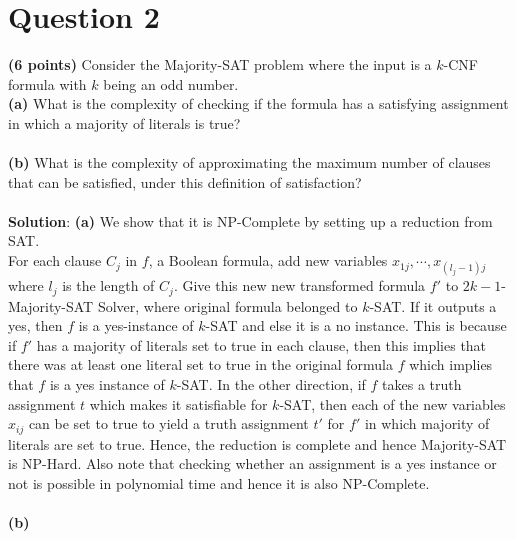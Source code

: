 \documentclass{article}
\begin{document}
\section{Question 2}
{\bf (6 points)} Consider the Majority-SAT problem where the input is a $k$-CNF formula with $k$ being an odd number.\\
{\bf (a)} What is the complexity of checking if the formula has a satisfying assignment in which a majority of literals is true?\\\\
{\bf (b)} What is the complexity of approximating the maximum number of clauses that can be satisfied, under this definition of satisfaction?\\\\
{\bf Solution}:
{\bf (a)} 
We show that it is NP-Complete by setting up a reduction from SAT.\\
For each clause $C_{j}$ in $f$, a Boolean formula, add new variables $x_{1j}, \cdots, x_{(l_{j}-1)j}$ where $l_{j}$ is the length of $C_{j}$. Give this new new transformed formula $f'$ to $2k-1$-Majority-SAT Solver, where original formula belonged to $k$-SAT. If it outputs a yes, then $f$ is a yes-instance of $k$-SAT and else it is a no instance. This is because if $f'$ has a majority of literals set to true in each clause, then this implies that there was at least one literal set to true in the original formula $f$ which implies that $f$ is a yes instance of $k$-SAT. In the other direction, if $f$ takes a truth assignment $t$ which makes it satisfiable for $k$-SAT, then each of the new variables $x_{ij}$ can be set to true to yield a truth assignment $t'$ for $f'$ in which majority of literals are set to true. Hence, the reduction is complete and hence Majority-SAT is NP-Hard. Also note that checking whether an assignment is a yes instance or not is possible in polynomial time and hence it is also NP-Complete.\\\\
{\bf (b)}
\end{document}
